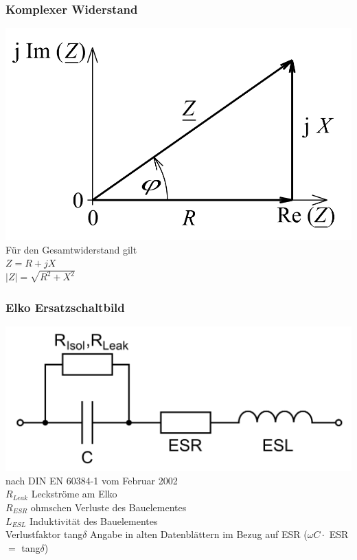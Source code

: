 \begin{frame}
\frametitle{Komplexer Widerstand}
\begin{center}
		\includegraphics[width=.8\textwidth]{a03/Widerstand_Zeiger.png}
        \tiny \hyperlink{refs}{\cite{wc}}
Für den Gesamtwiderstand gilt\\
\huge{$Z = R + jX$}\\
\huge{$|Z| = \sqrt{R^2 + X^2}$}
\end{center}
\end{frame}
	
\begin{frame}
\frametitle{Elko Ersatzschaltbild}
\begin{center}
		\includegraphics[width=.8\textwidth]{a03/Elko-Ersatzschaltbild.png}
        \tiny \hyperlink{refs}{\cite{wc}}\\
        nach DIN EN 60384-1 vom Februar 2002 \\
        \huge{$R_{Leak}$} \normalsize Leckströme am Elko\\
        \huge{$R_{ESR}$} \normalsize ohmschen Verluste des Bauelementes\\
        \huge{$L_{ESL}$} \normalsize Induktivität des Bauelementes\\
        \huge{Verlustfaktor tang$\delta$} \normalsize Angabe in alten Datenblättern im Bezug auf ESR ($\omega C \cdot$ ESR $=$ tang$\delta$)
\end{center}
\end{frame}
	

